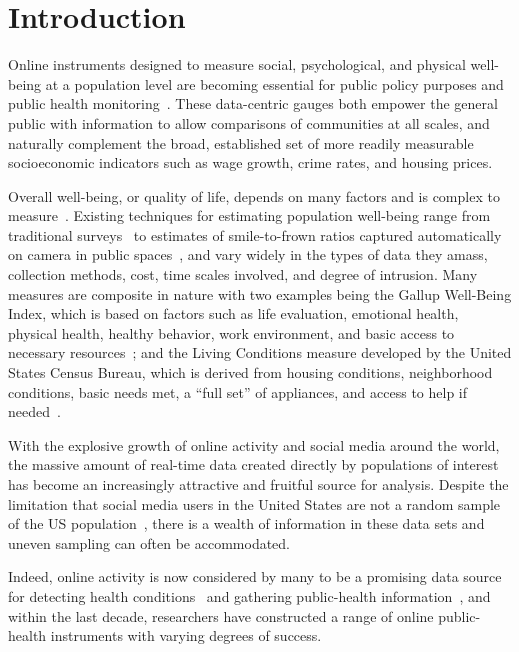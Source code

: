 \section*{Introduction}
\label{sec:fluxwell.intro}

Online instruments designed to measure social,
psychological, and physical well-being at a population level are 
becoming essential for public policy purposes and public health monitoring~\cite{CDC2013,dodds2011e}.
These data-centric gauges both 
empower the general public with information
to allow comparisons of communities at all scales,
and naturally
complement the broad, established
set of more readily measurable socioeconomic indicators 
such as wage growth, crime rates, and housing prices.

Overall well-being, or quality of life, depends on  many factors 
and is complex to measure~\cite{diener1995}.
Existing techniques for estimating population well-being range from traditional surveys~\cite{CDC2013,gallup}
to estimates of smile-to-frown ratios captured automatically
on camera in public spaces~\cite{feelometer}, and vary widely in the types of data they amass,
collection methods, cost, time scales involved, and
degree of intrusion.
Many measures are composite in nature 
with two examples being
the Gallup Well-Being Index, 
which is based on factors such as life evaluation, emotional health, physical health,
healthy behavior, work environment, and basic access to necessary
resources~\cite{gallup};
and
the Living Conditions measure developed by the United States Census Bureau,
which is derived from housing conditions,
neighborhood conditions, basic needs met, a ``full set'' of
appliances, and access to help if needed~\cite{census}.

With the explosive growth of online activity and social
media around the world, the massive amount of real-time
data created directly by populations
of interest has become an increasingly attractive and fruitful
source for analysis.
Despite the
limitation that social media users in the United States 
are not a random sample of the US 
population~\cite{pew}, 
there is a wealth of information in these data sets and uneven
sampling can often be accommodated.

Indeed, online activity is now considered by many to be a promising 
data source for detecting health
conditions~\cite{signorini2011,prieto2014} and 
gathering 
public-health
information~\cite{chew2010,paul2011},
and within the last decade, researchers have constructed a range of
online public-health instruments with varying degrees of success.

